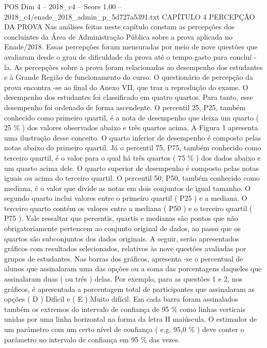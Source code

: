 \begin{textsample}{POS Dim 4 – 2018\_c4 – Score 1.00 – 2018\_c4/enade\_2018\_admin\_p\_5d727a5391.txt}  \label{ex:f4_pos_182}
CAPÍTULO 4 PERCEPÇÃO DA PROVA Nas análises feitas neste capítulo constam as percepções dos concluintes da Área de Administração Pública sobre a prova aplicada no Enade/2018.
Essas percepções foram mensuradas por meio de nove questões que avaliaram desde o grau de dificuldade da prova até o tempo gasto para concluí -la.
As percepções sobre a prova foram relacionadas ao desempenho dos estudantes e à Grande Região de funcionamento do curso.
O questionário de percepção da prova encontra -se ao final do Anexo VII, que traz a reprodução do exame.
O desempenho dos estudantes foi classificado em quatro quartos.
Para tanto, esse desempenho foi ordenado de forma ascendente.
O percentil 25, P25, também conhecido como primeiro quartil, é a nota de desempenho que deixa um quarto ( 25 \% ) dos valores observados abaixo e três quartos acima.
A Figura 1 apresenta uma ilustração desse conceito.
O quarto inferior de desempenho é composto pelas notas abaixo do primeiro quartil.
Já o percentil 75, P75, também conhecido como terceiro quartil, é o valor para o qual há três quartos ( 75 \% ) dos dados abaixo e um quarto acima dele.
O quarto superior de desempenho é composto pelas notas iguais ou acima do terceiro quartil.
O percentil 50, P50, também conhecido como mediana, é o valor que divide as notas em dois conjuntos de igual tamanho.
O segundo quarto inclui valores entre o primeiro quartil ( P25 ) e a mediana.
O terceiro quarto contém os valores entre a mediana ( P50 ) e o terceiro quartil ( P75 ).
Vale ressaltar que percentis, quartis e medianas são pontos que não obrigatoriamente pertencem ao conjunto original de dados, ao passo que os quartos são subconjuntos dos dados originais.
A seguir, serão apresentados gráficos com resultados selecionados, relativos às nove questões avaliadas por grupos de estudantes.
Nas barras dos gráficos, apresenta -se o percentual de alunos que assinalaram uma das opções ou a soma das porcentagens daqueles que assinalaram duas ( ou três ) delas.
Por exemplo, para as questões 1 e 2, nos gráficos, é apresentada a porcentagem total de participantes que assinalaram as opções ( D ) Difícil e ( E ) Muito difícil.
Em cada barra foram assinalados também os extremos do intervalo de confiança de 95 \% como linhas verticais unidas por uma linha horizontal na forma da letra H maiúscula.
O estimador de um parâmetro com um certo nível de confiança ( e.g. 95,0 \% ) deve conter o parâmetro no intervalo de confiança em 95 \% das vezes.

\end{textsample}
